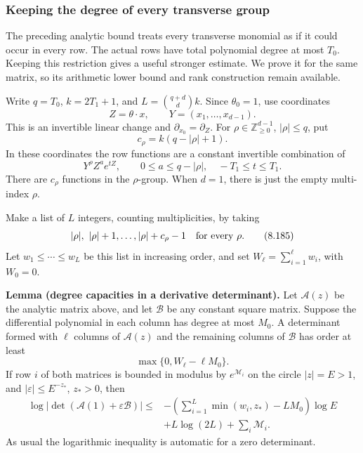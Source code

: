 \documentclass[
  11pt,
  a4paper,
]{article}
\begin{document}
\subsubsection{Keeping the degree of every transverse
group}\label{keeping-the-degree-of-every-transverse-group}

The preceding analytic bound treats every transverse monomial as if it
could occur in every row. The actual rows have total polynomial degree
at most \(T_0\). Keeping this restriction gives a useful stronger
estimate. We prove it for the same matrix, so its arithmetic lower bound
and rank construction remain available.

Write \(q=T_0\), \(k=2T_1+1\), and \(L=\binom{q+d}{d}k\). Since
\(\theta_0=1\), use coordinates \[
Z=\theta\cdot x,\qquad Y=(x_1,\ldots,x_{d-1}).
\] This is an invertible linear change and
\(\partial_{x_0}=\partial_Z\). For \(\rho\in\mathbb Z_{\ge0}^{d-1}\),
\(|\rho|\le q\), put \[
c_\rho=k(q-|\rho|+1).
\] In these coordinates the row functions are a constant invertible
combination of \[
Y^\rho Z^a e^{tZ},\qquad
0\le a\le q-|\rho|,\quad -T_1\le t\le T_1.
\] There are \(c_\rho\) functions in the \(\rho\)-group. When \(d=1\),
there is just the empty multi-index \(\rho\).

Make a list of \(L\) integers, counting multiplicities, by taking \[
|\rho|,\ |\rho|+1,\ldots,|\rho|+c_\rho-1
\quad\hbox{for every }\rho.
\tag{8.185}
\] Let \(w_1\le\cdots\le w_L\) be this list in increasing order, and set
\(W_\ell=\sum_{i=1}^{\ell}w_i\), with \(W_0=0\).

\textbf{Lemma (degree capacities in a derivative determinant).} Let
\(\mathcal A(z)\) be the analytic matrix above, and let \(\mathcal B\)
be any constant square matrix. Suppose the differential polynomial in
each column has degree at most \(M_0\). A determinant formed with
\(\ell\) columns of \(\mathcal A(z)\) and the remaining columns of
\(\mathcal B\) has order at least \[
\max\{0,W_\ell-\ell M_0\}.
\tag{8.186}
\] If row \(i\) of both matrices is bounded in modulus by
\(e^{\mathcal M_i}\) on the circle \(|z|=E>1\), and
\(|\varepsilon|\le E^{-z_*}\), \(z_*>0\), then \[
\begin{split}
\log|\det(\mathcal A(1)+\varepsilon\mathcal B)|
\le{}&
-\left(\sum_{i=1}^L\min(w_i,z_*)-LM_0\right)\log E\\
&+L\log(2L)+\sum_i\mathcal M_i .
\end{split}
\tag{8.187}
\] As usual the logarithmic inequality is automatic for a zero
determinant.
\end{document}
